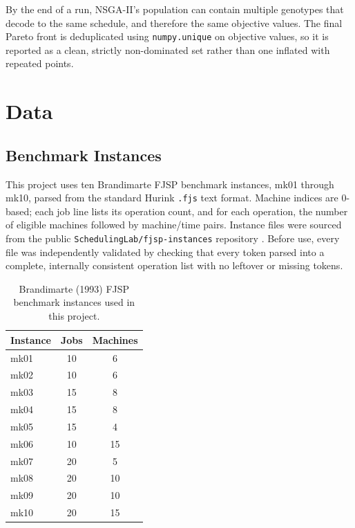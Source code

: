 \documentclass[11pt,a4paper]{article}
\begin{document}
By the end of a run, NSGA-II's population can contain multiple genotypes that decode to the same
schedule, and therefore the same objective values. The final Pareto front is deduplicated using
\texttt{numpy.unique} on objective values, so it is reported as a clean, strictly non-dominated set
rather than one inflated with repeated points.

\section{Data}
\label{sec:data}

\subsection{Benchmark Instances}
\label{subsec:data-benchmark}

This project uses ten Brandimarte \citep{brandimarte1993routing} FJSP benchmark instances,
mk01 through mk10, parsed from the standard Hurink \texttt{.fjs} text format. Machine indices are
0-based; each job line lists its operation count, and for each operation, the number of eligible
machines followed by machine/time pairs. Instance files were sourced from the public
\texttt{SchedulingLab/fjsp-instances} repository \citep{schedulinglab_fjsp}. Before use, every file
was independently validated by checking that every token parsed into a complete, internally
consistent operation list with no leftover or missing tokens.

\begin{table}[htbp]
    \centering
    \caption{Brandimarte (1993) FJSP benchmark instances used in this project.}
    \label{tab:benchmark-instances}
    \begin{tabular}{lcc}
        \toprule
        \textbf{Instance} & \textbf{Jobs} & \textbf{Machines} \\
        \midrule
        mk01 & 10 & 6 \\
        mk02 & 10 & 6 \\
        mk03 & 15 & 8 \\
        mk04 & 15 & 8 \\
        mk05 & 15 & 4 \\
        mk06 & 10 & 15 \\
        mk07 & 20 & 5 \\
        mk08 & 20 & 10 \\
        mk09 & 20 & 10 \\
        mk10 & 20 & 15 \\
        \bottomrule
    \end{tabular}
\end{table}
\end{document}
